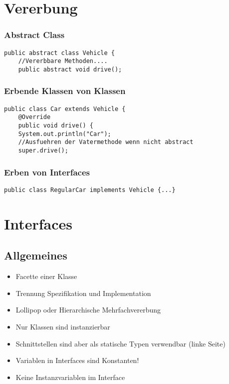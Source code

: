 \begin{multicols*}{5}
	
\section{Vererbung}
	\subsubsection{Abstract Class}
	\begin{lstlisting}
public abstract class Vehicle {
	//Vererbbare Methoden....
	public abstract void drive();
	\end{lstlisting}
	\subsubsection{Erbende Klassen von Klassen}
	\begin{lstlisting}
public class Car extends Vehicle {
	@Override
	public void drive() {
	System.out.println("Car");
	//Ausfuehren der Vatermethode wenn nicht abstract
	super.drive(); 
	\end{lstlisting}
	\subsubsection{Erben von Interfaces}
	\begin{lstlisting}
public class RegularCar implements Vehicle {...}
	\end{lstlisting}




\section{Interfaces}
	\subsection{Allgemeines}
	\begin{itemize}
		\item Facette einer Klasse
		\item Trennung Spezifikation und Implementation
		\item Lollipop oder Hierarchische Mehrfachvererbung
		\item Nur Klassen sind instanzierbar
		\item Schnittstellen sind aber als statische Typen verwendbar (linke Seite)
		\item Variablen in Interfaces sind Konstanten!
		\item Keine Instanzvariablen im Interface
	\end{itemize}

\end{multicols*}
